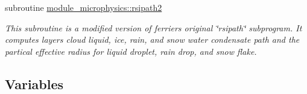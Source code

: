 \begin{DoxyCompactItemize}
\item 
subroutine \hyperlink{group__module__radiation__clouds_ga3645dec44f2cc7e30b57d32531f74ba4}{module\+\_\+microphysics\+::rsipath2}
\begin{DoxyCompactList}\small\item\em This subroutine is a modified version of ferrier\textquotesingle{}s original \char`\"{}rsipath\char`\"{} subprogram. It computes layer\textquotesingle{}s cloud liquid, ice, rain, and snow water condensate path and the partical effective radius for liquid droplet, rain drop, and snow flake. \end{DoxyCompactList}\end{DoxyCompactItemize}

\subsection*{Variables}

